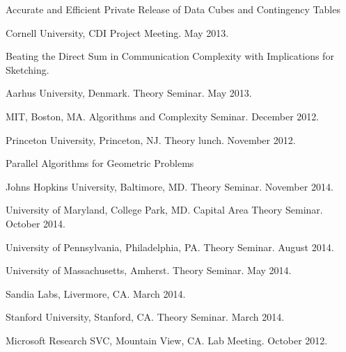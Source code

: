 \documentclass[11pt]{article}
\newenvironment{innerlist}[1][\enskip\textbullet]%
        {\begin{compactitem}[#1]}{\end{compactitem}}
\begin{document}
\begin{innerlist}
\item Accurate and Efficient Private Release of Data Cubes and Contingency Tables
\begin{innerlist}
\item Cornell University, CDI Project Meeting. May 2013.
\end{innerlist}

\item Beating the Direct Sum in Communication Complexity with Implications for Sketching.
\begin{innerlist}
\item Aarhus University, Denmark. Theory Seminar. May 2013.
\item MIT, Boston, MA. Algorithms and Complexity Seminar. December 2012.
\item Princeton University, Princeton, NJ. Theory lunch. November 2012.
\end{innerlist}


\item Parallel Algorithms for Geometric Problems
\begin{innerlist}
\item Johns Hopkins University, Baltimore, MD. Theory Seminar. November 2014.
\item University of Maryland, College Park, MD. Capital Area Theory Seminar. October 2014.
\item University of Pennsylvania, Philadelphia, PA. Theory Seminar. August 2014.
\item University of Massachusetts, Amherst. Theory Seminar. May 2014.
\item Sandia Labs, Livermore, CA. March 2014.
\item Stanford University, Stanford, CA. Theory Seminar. March 2014.
\item Microsoft Research SVC, Mountain View, CA. Lab Meeting. October 2012.
\end{innerlist}


\end{innerlist}
\end{document}
